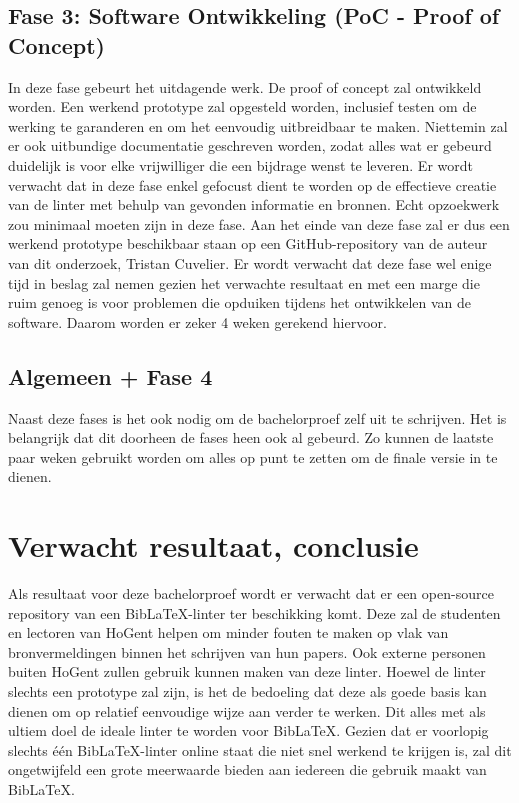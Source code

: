 \subsection{Fase 3: Software Ontwikkeling (PoC - Proof of Concept)}
In deze fase gebeurt het uitdagende werk. De proof of concept zal ontwikkeld worden. Een werkend prototype zal opgesteld worden, inclusief testen om de werking te garanderen en om het eenvoudig uitbreidbaar te maken. Niettemin zal er ook uitbundige documentatie geschreven worden, zodat 
alles wat er gebeurd duidelijk is voor elke vrijwilliger die een bijdrage wenst te leveren. Er wordt verwacht dat in deze fase enkel gefocust dient te worden op de effectieve creatie van de linter met behulp van gevonden informatie en bronnen. Echt opzoekwerk zou minimaal moeten zijn in deze fase.
Aan het einde van deze fase zal er dus een werkend prototype beschikbaar staan op een GitHub-repository van de auteur van dit onderzoek, Tristan Cuvelier. 
Er wordt verwacht dat deze fase wel enige tijd in beslag zal nemen gezien het verwachte resultaat en met een marge die ruim genoeg is voor problemen die opduiken tijdens het ontwikkelen van de software. Daarom worden er zeker 4 weken gerekend hiervoor.

\subsection{Algemeen + Fase 4}
Naast deze fases is het ook nodig om de bachelorproef zelf uit te schrijven. Het is belangrijk dat dit doorheen de fases heen ook al gebeurd. Zo kunnen de laatste paar weken gebruikt worden om alles op punt te zetten om de finale versie in te dienen.

\section{Verwacht resultaat, conclusie}%
\label{sec:verwachte_resultaten}

Als resultaat voor deze bachelorproef wordt er verwacht dat er een open-source repository van een BibLaTeX-linter ter beschikking komt. Deze zal de studenten en lectoren van HoGent helpen om minder fouten te maken op vlak van bronvermeldingen binnen het schrijven van hun papers. Ook externe personen buiten HoGent zullen gebruik kunnen maken van deze linter.
Hoewel de linter slechts een prototype zal zijn, is het de bedoeling dat deze als goede basis kan dienen om op relatief eenvoudige wijze aan verder te werken. Dit alles met als ultiem doel de ideale linter te worden voor BibLaTeX. Gezien dat er voorlopig slechts één BibLaTeX-linter online staat die niet snel werkend te krijgen is, zal dit ongetwijfeld een grote meerwaarde bieden aan iedereen die gebruik maakt van BibLaTeX.

